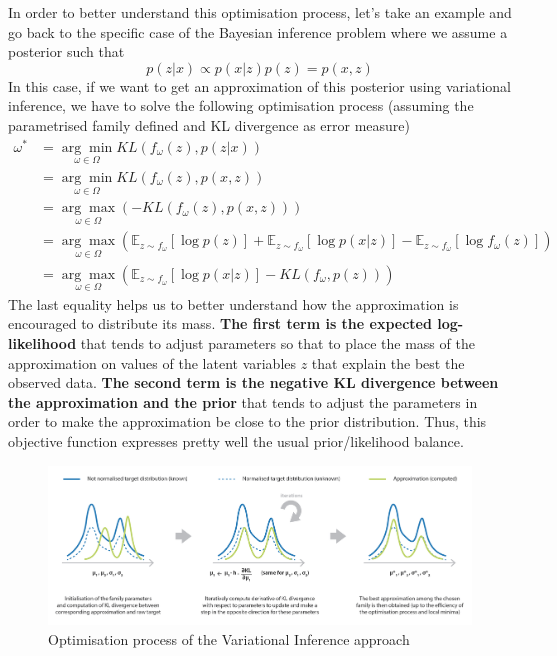 In order to better understand this optimisation process, let's take an example and go back to the specific case of the Bayesian inference problem where we assume a posterior such that
\begin{equation}p(z | x) \propto p(x | z) p(z)=p(x, z)\end{equation}
In this case, if we want to get an approximation of this posterior using variational inference, we have to solve the following optimisation process (assuming the parametrised family defined and KL divergence as error measure)
\begin{equation}\begin{aligned}
\omega^{*} &=\underset{\omega \in \Omega}{\arg \min } K L\left(f_{\omega}(z), p(z | x)\right) \\
&=\underset{\omega \in \Omega}{\arg \min } K L\left(f_{\omega}(z), p(x, z)\right) \\
&=\underset{\omega \in \Omega}{\arg \max }\left(-K L\left(f_{\omega}(z), p(x, z)\right)\right) \\
&=\underset{\omega \in \Omega}{\arg \max }\left(\mathbb{E}_{z \sim f_{\omega}}[\log p(z)]+\mathbb{E}_{z \sim f_{\omega}}[\log p(x | z)]-\mathbb{E}_{z \sim f_{\omega}}\left[\log f_{\omega}(z)\right]\right) \\
&=\underset{\omega \in \Omega}{\arg \max }\left(\mathbb{E}_{z \sim f_{\omega}}[\log p(x | z)]-K L\left(f_{\omega}, p(z)\right)\right)
\end{aligned}\end{equation}
The last equality helps us to better understand how the approximation is encouraged to distribute its mass. \textbf{The first term is the expected log-likelihood} that tends to adjust parameters so that to place the mass of the approximation on values of the latent variables $z$ that explain the best the observed data. \textbf{The second term is the negative KL divergence between the approximation and the prior} that tends to adjust the parameters in order to make the approximation be close to the prior distribution. Thus, this objective function expresses pretty well the usual prior/likelihood balance.

\begin{figure}[h]
    \centering
\includegraphics[width=\textwidth]{pic/p05c08-snip08.png}
    \caption{Optimisation process of the Variational Inference approach}
    \label{fig:p05c08-snip08}
\end{figure}


